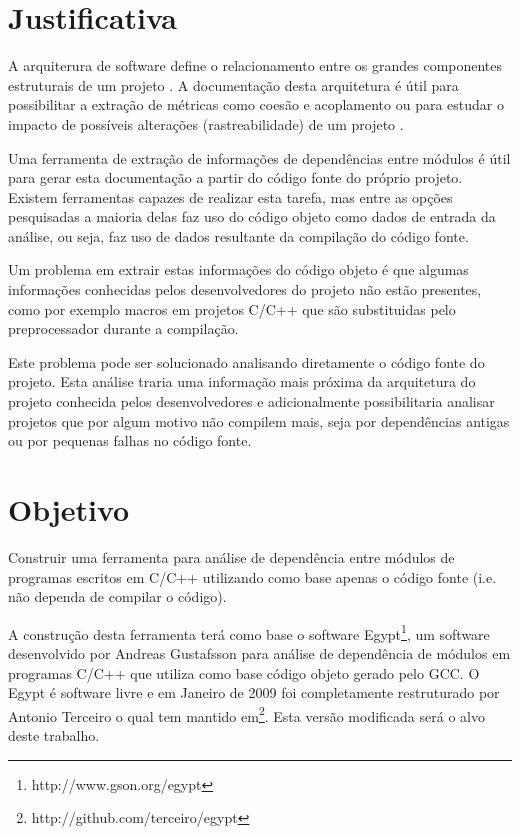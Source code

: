 \chapter{Justificativa}

A arquiterura de software define o relacionamento entre os grandes componentes
estruturais de um projeto \cite{EngenhariaDeSoftwarePressman}. A documentação
desta arquitetura é útil para possibilitar a extração de métricas como coesão e
acoplamento ou para estudar o impacto de possíveis alterações (rastreabilidade)
de um projeto \cite{mata26-terceiro-projeto-piloto}.

Uma ferramenta de extração de informações de dependências entre módulos é útil
para gerar esta documentação a partir do código fonte do próprio projeto.
Existem ferramentas capazes de realizar esta tarefa, mas entre as opções
pesquisadas \cite{SourceVersusObjectCodeExtraction} a maioria delas faz uso do
código objeto como dados de entrada da análise, ou seja, faz uso de dados
resultante da compilação do código fonte.

Um problema em extrair estas informações do código objeto é que algumas
informações conhecidas pelos desenvolvedores do projeto não estão presentes,
como por exemplo macros em projetos C/C++ que são substituidas pelo
preprocessador \cite{SourceVersusObjectCodeExtraction} durante a compilação.

Este problema pode ser solucionado analisando diretamente o código fonte do
projeto. Esta análise traria uma informação mais próxima da arquitetura do
projeto conhecida pelos desenvolvedores e adicionalmente possibilitaria
analisar projetos que por algum motivo não compilem mais, seja por dependências
antigas ou por pequenas falhas no código fonte.

\chapter{Objetivo}

Construir uma ferramenta para análise de dependência entre módulos de programas
escritos em C/C++ utilizando como base apenas o código fonte (i.e.  não dependa
de compilar o código).

A construção desta ferramenta terá como base o software
Egypt\footnote{http://www.gson.org/egypt}, um software desenvolvido por Andreas
Gustafsson para análise de dependência de módulos em programas C/C++ que
utiliza como base código objeto gerado pelo GCC. O Egypt é software livre e em
Janeiro de 2009 foi completamente restruturado por Antonio Terceiro o qual tem
mantido em\footnote{http://github.com/terceiro/egypt}. Esta versão modificada
será o alvo deste trabalho.

